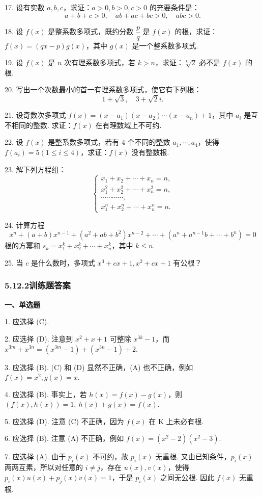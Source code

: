 \documentclass[UTF8, 12pt, fontset=fandol, oneside]{ctexart}
\begin{document}
17. 设有实数 $a,b,c$，求证：$a>0,b>0,c>0$ 的充要条件是：
\[
a+b+c>0,\quad ab+ac+bc>0,\quad abc>0.
\]

18. 设 $f(x)$ 是整系数多项式，既约分数 $\dfrac{p}{q}$ 是 $f(x)$ 的根，求证：$f(x)=(qx-p)g(x)$，其中 $g(x)$ 是一个整系数多项式.

19. 设 $f(x)$ 是 $n$ 次有理系数多项式，若 $k>n$，求证：$\sqrt[k]{2}$ 必不是 $f(x)$ 的根.

20. 写出一个次数最小的首一有理系数多项式，使它有下列根：
\[
1+\sqrt{3},\quad 3+\sqrt{2}i.
\]

21. 设奇数次多项式 $f(x)=(x-a_1)(x-a_2)\cdots(x-a_n)+1$，其中 $a_i$ 是互不相同的整数. 求证：$f(x)$ 在有理数域上不可约.

22. 设 $f(x)$ 是整系数多项式，若有 4 个不同的整数 $a_1,\cdots,a_4$，使得 $f(a_i)=5(1\le i\le4)$，求证：$f(x)$ 没有整数根.

23. 解下列方程组：
\[
\begin{cases}
x_1+x_2+\cdots+x_n=n,\\
x_1^2+x_2^2+\cdots+x_n^2=n,\\
\cdots\cdots\cdots\cdots,\\
x_1^n+x_2^n+\cdots+x_n^n=n.
\end{cases}
\]

24. 计算方程
\[
x^n+(a+b)x^{n-1}+(a^2+ab+b^2)x^{n-2}+\cdots+(a^n+a^{n-1}b+\cdots+b^n)=0
\]
根的方幂和 $s_k=x_1^k+x_2^k+\cdots+x_n^k$，其中 $k\le n$.

25. 当 $c$ 是什么数时，多项式 $x^3+cx+1,x^2+cx+1$ 有公根？

\subsubsection*{5.12.2\quad 训练题答案}

\noindent\textbf{一、单选题}

1. 应选择 (C).

2. 应选择 (D). 注意到 $x^2+x+1$ 可整除 $x^{3k}-1$，而 $x^{3m}+x^{3n}=(x^{3m}-1)+(x^{3n}-1)+2$.

3. 应选择 (B). (C) 和 (D) 显然不正确，(A) 也不正确，例如 $f(x)=x^2,g(x)=x$.

4. 应选择 (B). 事实上，若 $h(x)=f(x)-g(x)$，则 $(f(x),h(x))=1,\ h(x)+g(x)=f(x)$.

5. 应选择 (D). 注意 (C) 不正确，因为 $f(x)$ 在 K 上未必有根.

6. 应选择 (B). 注意 (A) 不正确，例如 $f(x)=(x^2-2)(x^2-3)$.

7. 应选择 (A). 由于 $p_i(x)$ 不可约，故 $p_i(x)$ 无重根. 又由已知条件，$p_i(x)$ 两两互素，所以对任意的 $i\ne j$，存在 $u(x),v(x)$，使得 $p_i(x)u(x)+p_j(x)v(x)=1$，于是 $p_i(x)$ 之间无公根. 因此 $f(x)$ 无重根.
\end{document}
